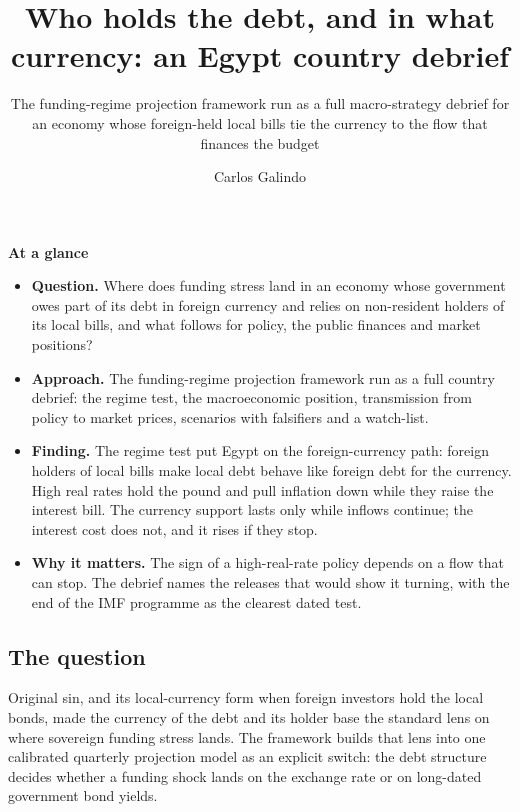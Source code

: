 \documentclass[
  british,
  a4paper,
]{article}
\title{Who holds the debt, and in what currency: an Egypt country
debrief}
\subtitle{The funding-regime projection framework run as a full
macro-strategy debrief for an economy whose foreign-held local bills tie
the currency to the flow that finances the budget}
\author{Carlos Galindo}
\date{}
\providecommand{\tightlist}{%
  \setlength{\itemsep}{0pt}\setlength{\parskip}{0pt}}
\begin{document}
\maketitle


\begin{tcolorbox}[enhanced jigsaw, arc=.35mm, bottomrule=.15mm, breakable, colback=white, colframe=quarto-callout-note-color-frame, left=2mm, leftrule=.75mm, opacityback=0, rightrule=.15mm, toprule=.15mm]

\vspace{-3mm}\textbf{At a glance}\vspace{3mm}

\begin{itemize}
\tightlist
\item
  \textbf{Question.} Where does funding stress land in an economy whose
  government owes part of its debt in foreign currency and relies on
  non-resident holders of its local bills, and what follows for policy,
  the public finances and market positions?
\item
  \textbf{Approach.} The funding-regime projection framework run as a
  full country debrief: the regime test, the macroeconomic position,
  transmission from policy to market prices, scenarios with falsifiers
  and a watch-list.
\item
  \textbf{Finding.} The regime test put Egypt on the foreign-currency
  path: foreign holders of local bills make local debt behave like
  foreign debt for the currency. High real rates hold the pound and pull
  inflation down while they raise the interest bill. The currency
  support lasts only while inflows continue; the interest cost does not,
  and it rises if they stop.
\item
  \textbf{Why it matters.} The sign of a high-real-rate policy depends
  on a flow that can stop. The debrief names the releases that would
  show it turning, with the end of the IMF programme as the clearest
  dated test.
\end{itemize}

\end{tcolorbox}

\subsection{The question}\label{the-question}

Original sin, and its local-currency form when foreign investors hold
the local bonds, made the currency of the debt and its holder base the
standard lens on where sovereign funding stress lands. The framework
builds that lens into one calibrated quarterly projection model as an
explicit switch: the debt structure decides whether a funding shock
lands on the exchange rate or on long-dated government bond yields.
\end{document}
